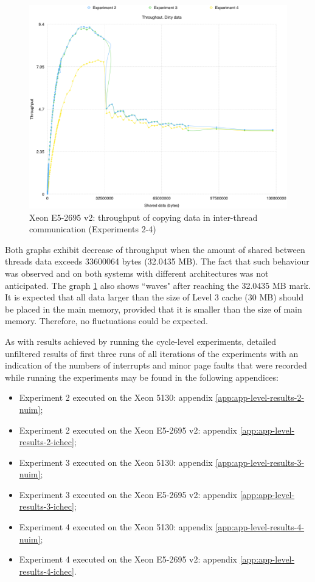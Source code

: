\begin{figure}[!htb]
\centering
\includegraphics[width=145mm]{6/App_experiment_1_dirty_throughput_ichec.png}
\caption{Xeon E5-2695 v2: throughput of copying data in inter-thread communication (Experiments 2-4)}
\label{App_experiment_1_throughput_dirty_ichec}
\end{figure}

Both graphs exhibit decrease of throughput when the amount of shared between threads data exceeds 33600064 bytes (32.0435 MB). The fact that such behaviour was observed and on both systems with different architectures was not anticipated. The graph \ref{App_experiment_1_throughput_dirty_ichec} also shows ``waves" after reaching the 32.0435 MB mark. It is expected that all data larger than the size of Level 3 cache (30 MB) should be placed in the main memory, provided that it is smaller than the size of main memory. Therefore, no fluctuations could be expected.

As with results achieved by running the cycle-level experiments, detailed unfiltered results of first three runs of all iterations of the experiments with an indication of the numbers of interrupts and minor page faults that were recorded while running the experiments may be found in the following appendices:

\begin{itemize}
  \item Experiment 2 executed on the Xeon 5130: appendix \ref{app:app-level-results-2-nuim};
  \item Experiment 2 executed on the Xeon E5-2695 v2: appendix \ref{app:app-level-results-2-ichec};
  \item Experiment 3 executed on the Xeon 5130: appendix \ref{app:app-level-results-3-nuim};
  \item Experiment 3 executed on the Xeon E5-2695 v2: appendix \ref{app:app-level-results-3-ichec};
  \item Experiment 4 executed on the Xeon 5130: appendix \ref{app:app-level-results-4-nuim};
  \item Experiment 4 executed on the Xeon E5-2695 v2: appendix \ref{app:app-level-results-4-ichec}.
\end{itemize}

